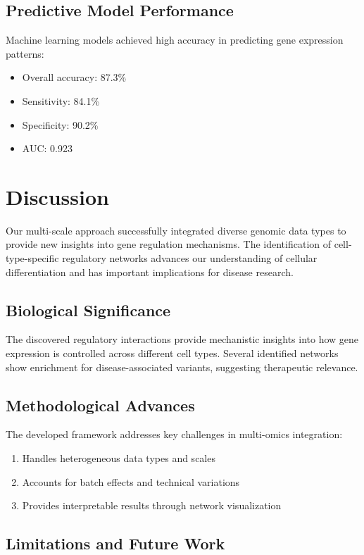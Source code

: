 \documentclass[11pt,a4paper]{article}
\begin{document}
\subsection{Predictive Model Performance}

Machine learning models achieved high accuracy in predicting gene expression patterns:
\begin{itemize}
\item Overall accuracy: 87.3\%
\item Sensitivity: 84.1\%
\item Specificity: 90.2\%
\item AUC: 0.923
\end{itemize}

\section{Discussion}

Our multi-scale approach successfully integrated diverse genomic data types to provide new insights into gene regulation mechanisms. The identification of cell-type-specific regulatory networks advances our understanding of cellular differentiation and has important implications for disease research.

\subsection{Biological Significance}

The discovered regulatory interactions provide mechanistic insights into how gene expression is controlled across different cell types. Several identified networks show enrichment for disease-associated variants, suggesting therapeutic relevance.

\subsection{Methodological Advances}

The developed framework addresses key challenges in multi-omics integration:
\begin{enumerate}
\item Handles heterogeneous data types and scales
\item Accounts for batch effects and technical variations
\item Provides interpretable results through network visualization
\end{enumerate}

\subsection{Limitations and Future Work}
\end{document}
